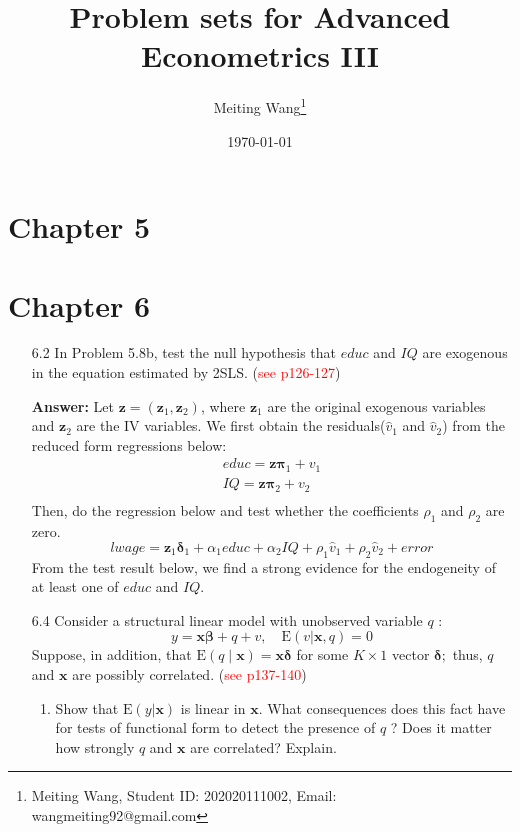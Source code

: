 \documentclass[UTF8]{article} %
\title{
	Problem sets for Advanced Econometrics III
}
\author{Meiting Wang\thanks{Meiting Wang, Student ID: 202020111002, Email: wangmeiting92@gmail.com}}
\date{\today}
\begin{document}
\maketitle
\tableofcontents
{}


\clearpage
{}
\section*{Chapter 5}



\clearpage
\section*{Chapter 6}

\begin{enumerate}
    \item[6.2] In Problem 5.8b, test the null hypothesis that $educ$ and $IQ$ are exogenous in the equation estimated by 2SLS. (\textcolor{red}{see p126-127})
    
    \textbf{Answer:} Let $\mathbf{z}=(\mathbf{z}_1,\mathbf{z}_2)$, where $\mathbf{z}_1$ are the original exogenous variables and $\mathbf{z}_2$ are the IV variables. We first obtain the residuals($\hat{v}_1$ and $\hat{v}_2$) from the reduced form regressions below:
    \begin{align*}
        educ = \mathbf{z}\bm{\pi}_1 + v_1 \\ 
        IQ = \mathbf{z}\bm{\pi}_2 + v_2 \\ 
    \end{align*}
    Then, do the regression below and test whether the coefficients $\rho_1$ and $\rho_2$ are zero.
    \[ lwage = \mathbf{z}_1\bm{\delta}_1 + \alpha_1 educ + \alpha_2 IQ + \rho_1\hat{v}_1 + \rho_2\hat{v}_2 + error \]
    From the test result below, we find a strong evidence for the endogeneity of at least one of $educ$ and $IQ$. 
    
    
    \item[6.4] Consider a structural linear model with unobserved variable $q$ :
    \[ y=\mathbf{x} \boldsymbol{\beta}+q+v, \quad \mathrm{E}(v | \mathbf{x}, q)=0 \]
    Suppose, in addition, that $\mathrm{E}(q \mid \mathbf{x})=\mathbf{x} \boldsymbol{\delta}$ for some $K \times 1$ vector $\boldsymbol{\delta} ;$ thus, $q$ and $\mathbf{x}$ are possibly correlated. (\textcolor{red}{see p137-140})
    \begin{enumerate}
        \item Show that $\mathrm{E}(y | \mathbf{x})$ is linear in $\mathbf{x}$. What consequences does this fact have for tests of functional form to detect the presence of $q$ ? Does it matter how strongly $q$ and $\mathbf{x}$ are correlated? Explain.
        

\end{enumerate}
\end{enumerate}
\end{document}
